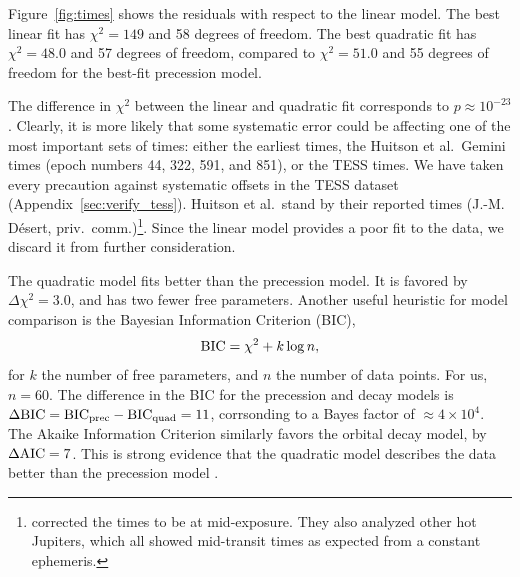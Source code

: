 \documentclass[12pt,twocolumn,tighten]{aastex62}
\begin{document}

Figure~\ref{fig:times} shows the residuals with respect to the linear
model.  The best linear fit has $\chi^2 = 149$ and 58 degrees of
freedom.  The best quadratic fit has $\chi^2 = 48.0$ and 57
degrees of freedom, compared to $\chi^2 = 51.0$
and 55 degrees of freedom for the best-fit precession model.

The difference in $\chi^2$ between the linear and quadratic fit
corresponds to $p \approx 10^{-23}$.  Clearly, it is more likely that
some systematic error could be affecting one of the most important
sets of times: either the earliest times, the Huitson et al.\ Gemini
times (epoch numbers 44, 322, 591, and 851), or the TESS times.  We
have taken every precaution against systematic offsets in the TESS
dataset (Appendix~\ref{sec:verify_tess}). Huitson et al.\ stand by
their reported times (J.-M. D\'esert, priv.\
comm.)\footnote{\citealt{huitson_gemini_2017} corrected the times to
be at mid-exposure. They also analyzed other hot Jupiters, which all
showed mid-transit times as expected from a constant ephemeris.}.
Since the linear model provides a poor fit to the data, we discard it
from further consideration.

The quadratic model fits better than the precession model.  It is
favored by $\Delta \chi^2 = 3.0$, and has two fewer free parameters.
Another useful heuristic for model comparison is the Bayesian
Information Criterion (BIC),
\begin{equation}
  {\rm BIC} = \chi^2 + k\log n,
\end{equation}
for $k$ the number of free parameters, and $n$ the number of data
points. For us, $n=60$.  The difference in the BIC for the precession
and decay models is $\Delta {\rm BIC} = {\rm BIC}_{\rm prec} - {\rm
BIC}_{\rm quad} = 11$, corrsonding to a Bayes factor of $\approx
4\times10^{4}$.  The Akaike Information Criterion
similarly favors the orbital decay model, by $\Delta {\rm AIC} = 7$.
This is strong evidence that the quadratic model describes the
data better than the precession model \citep{kass_bayes_1995}.
\end{document}
